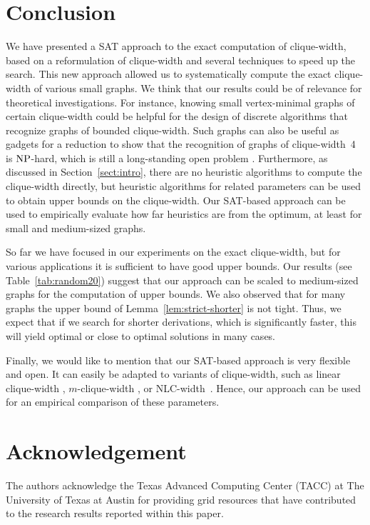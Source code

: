 \documentclass[10pt,usletter]{article}
\theoremstyle{remark}
\newcommand{\NP}{\text{\normalfont NP}}
\newcommand{\hy}{\hbox{-}\nobreak\hskip0pt}
\begin{document}
\section{Conclusion}

We have presented a SAT approach to the exact computation of
clique-width, based on a reformulation of clique-width and several
techniques to speed up the search.  This new approach allowed us to
systematically compute the exact clique-width of various small graphs.  
We think that our results could be of relevance for theoretical investigations. 
For instance, knowing small vertex-minimal graphs of certain clique-width 
could be helpful for the design
of discrete algorithms that recognize graphs of bounded
clique-width. Such graphs can also be useful as gadgets for a
reduction to show that the recognition of graphs of clique-width~4 is
$\NP$\hy hard, which is still a long-standing open problem
\cite{FellowsRosamondRoticsSzeider09}.  Furthermore, as discussed in
Section~\ref{sect:intro}, there are no heuristic algorithms to compute
the clique-width directly, but heuristic algorithms for related
parameters can be used to obtain upper bounds on the clique-width. Our
SAT-based approach can be used to empirically evaluate how far
heuristics are from the optimum, at least for small and
medium-sized graphs. 

So far we have focused in our experiments on the exact clique-width,
but for various applications it is sufficient to have  good upper
bounds. Our results (see Table~\ref{tab:random20}) suggest that our
approach can be scaled to medium-sized graphs for the computation of
upper bounds.  We also observed that for many graphs the upper bound
of Lemma~\ref{lem:strict-shorter} is not tight. Thus, we expect that
if we search for shorter derivations, which is significantly faster,
this will yield optimal or close to optimal solutions in many cases.


Finally, we would like to mention that our SAT-based approach is very
flexible and open. It can easily be adapted to variants of
clique-width, such as linear clique-width
\cite{HeggernesMeisterPapadopoulos12,FellowsRosamondRoticsSzeider09},
$m$\hy clique-width \cite{CourcelleTwigg10}, or
NLC-width~\cite{Wanke94}. Hence, our approach can be used for an
empirical comparison of these parameters.

\section*{Acknowledgement}
The authors acknowledge the Texas Advanced Computing Center (TACC) at The University of Texas at 
Austin for providing grid resources that have contributed to the research results reported within this paper.
\end{document}
